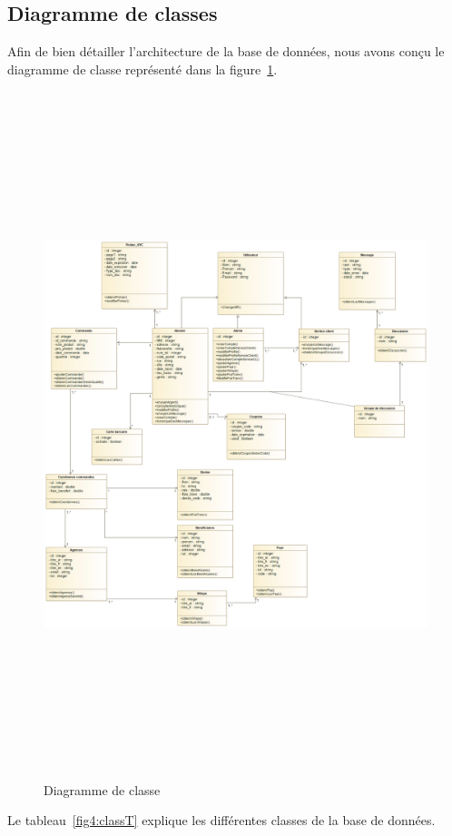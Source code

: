 \subsection{Diagramme de classes}
Afin de bien détailler l’architecture de la base de données, nous avons conçu le diagramme de
classe représenté dans la figure~\ref{fig4:class}.
\begin{figure}[h!]
	\includegraphics[width=18cm, height=20cm]{./Template LaTeX/Images/Diagramme_de_classe_V3.png}
	\caption{Diagramme de classe}
	\label{fig4:class}
\end{figure}
\newpage
\hspace*{-2cm} Le tableau~\ref{fig4:classT} explique les différentes classes de la base de données.
